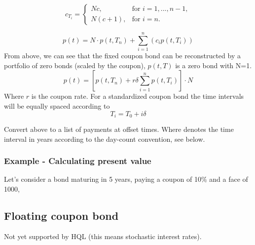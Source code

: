 \documentclass[11pt,a4paper]{article}
\numberwithin{equation}{section}
\begin{document}
\[ c_{T_i} = \left\{
\begin{array}{ll}
  Nc, & \text{for } i=1,...,n-1,  \\
  N(c+1), &\text{for } i=n.
\end{array} \right.\]

\[
p(t) = N \cdot p(t,T_n)+\sum_{i=1}^{n} (c_ip(t,T_i))
\]
From above, we can see that the fixed coupon bond can be reconstructed by a portfolio of zero
bonds (scaled by the coupon), $p(t,T)$ is a zero bond with N=1.
\[
p(t)=\left[p(t,T_n)+r\delta\sum_{i=1}^{n} p(t,T_i)\right]\cdot N
\]
Where $r$ is the coupon rate. For a standardized coupon bond the time intervals will be equally
spaced according to
\[
T_i=T_0+i\delta
\]

Convert above to a list of payments at offset times. Where denotes the time interval in years
according to the day-count convention, see below.

\subsubsection{Example - Calculating present value}


Let's consider a bond maturing in 5 years, paying a coupon of 10\% and a face of 1000,


\subsection{Floating coupon bond}
Not yet supported by HQL (this means stochastic interest rates).
\end{document}

